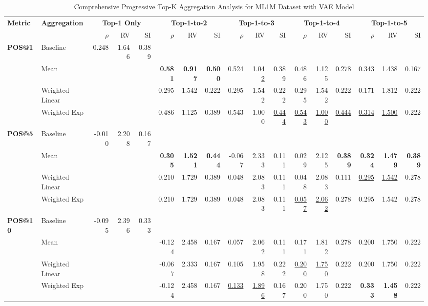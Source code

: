 \documentclass{article}
\begin{document}
\begin{table}[htbp]
\centering
\caption{Comprehensive Progressive Top-K Aggregation Analysis for ML1M Dataset with VAE Model}
\label{tab:ml1m_vae_progressive_topk_comprehensive}
\scriptsize
\begin{tabular}{@{}llrrr|rrr|rrr|rrr|rrr@{}}
\toprule
\multirow{2}{*}{\textbf{Metric}} & \multirow{2}{*}{\textbf{Aggregation}} & \multicolumn{3}{c|}{\textbf{Top-1 Only}} & \multicolumn{3}{c|}{\textbf{Top-1-to-2}} & \multicolumn{3}{c|}{\textbf{Top-1-to-3}} & \multicolumn{3}{c|}{\textbf{Top-1-to-4}} & \multicolumn{3}{c}{\textbf{Top-1-to-5}} \\
\cmidrule(lr){3-5} \cmidrule(lr){6-8} \cmidrule(lr){9-11} \cmidrule(lr){12-14} \cmidrule(lr){15-17}
& & $\rho$ & RV & SI & $\rho$ & RV & SI & $\rho$ & RV & SI & $\rho$ & RV & SI & $\rho$ & RV & SI \\
\midrule

\multirow{4}{*}{\textbf{POS@1}} 
& Baseline & 0.248 & 1.646 & 0.389 & & & & & & & & & & & & \\
& Mean & & & & \textbf{0.581} & \textbf{0.917} & \textbf{0.500} & \uline{0.524} & \uline{1.042} & 0.389 & 0.486 & 1.125 & 0.278 & 0.343 & 1.438 & 0.167 \\
& Weighted Linear & & & & 0.295 & 1.542 & 0.222 & 0.295 & 1.542 & 0.222 & 0.295 & 1.542 & 0.222 & 0.171 & 1.812 & 0.222 \\
& Weighted Exp & & & & 0.486 & 1.125 & 0.389 & 0.543 & 1.000 & \uline{0.444} & \uline{0.543} & \uline{1.000} & \uline{0.444} & \uline{0.314} & \uline{1.500} & 0.222 \\
\midrule

\multirow{4}{*}{\textbf{POS@5}} 
& Baseline & -0.010 & 2.208 & 0.167 & & & & & & & & & & & & \\
& Mean & & & & \textbf{0.305} & \textbf{1.521} & \textbf{0.444} & -0.067 & 2.333 & 0.111 & 0.029 & 2.125 & \textbf{0.389} & \textbf{0.324} & \textbf{1.479} & \textbf{0.389} \\
& Weighted Linear & & & & 0.210 & 1.729 & 0.389 & 0.048 & 2.083 & 0.111 & 0.048 & 2.083 & 0.111 & \uline{0.295} & \uline{1.542} & 0.278 \\
& Weighted Exp & & & & 0.210 & 1.729 & 0.389 & 0.048 & 2.083 & 0.111 & \uline{0.057} & \uline{2.062} & 0.278 & 0.295 & 1.542 & 0.278 \\
\midrule

\multirow{4}{*}{\textbf{POS@10}} 
& Baseline & -0.095 & 2.396 & 0.333 & & & & & & & & & & & & \\
& Mean & & & & -0.124 & 2.458 & 0.167 & 0.057 & 2.062 & 0.111 & 0.171 & 1.812 & 0.278 & 0.200 & 1.750 & 0.222 \\
& Weighted Linear & & & & -0.067 & 2.333 & 0.167 & 0.105 & 1.958 & 0.222 & \uline{0.200} & \uline{1.750} & 0.222 & 0.200 & 1.750 & 0.222 \\
& Weighted Exp & & & & -0.124 & 2.458 & 0.167 & \uline{0.133} & \uline{1.896} & 0.167 & 0.200 & 1.750 & 0.222 & \textbf{0.333} & \textbf{1.458} & 0.222 \\
\midrule


\end{tabular}
\end{table}
\end{document}
